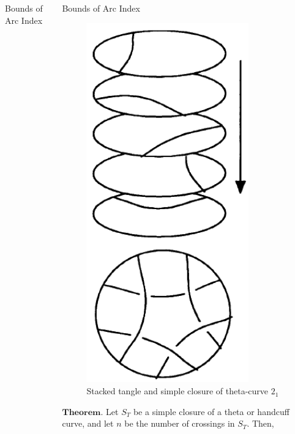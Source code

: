 \documentclass[final]{beamer}
\begin{document}
\begin{frame}[t]
\begin{columns}[t]
\begin{block}{Bounds of Arc Index}
  \end{block}
  \begin{block}{Bounds of Arc Index}
    \begin{figure}
      \centering
      \includegraphics[width=0.8\textwidth]{../Midterm_Poster/figure/stacked_tangle.png}
      \caption{Stacked tangle and simple closure of theta-curve $2_1$}
    \end{figure}
    $\mathbf{Theorem.}$ Let $S_T$ be a simple closure of a theta or handcuff curve, and let $n$ be the number of crossings in $S_T$. Then,

\end{block}
\end{columns}
\end{frame}
\end{document}
